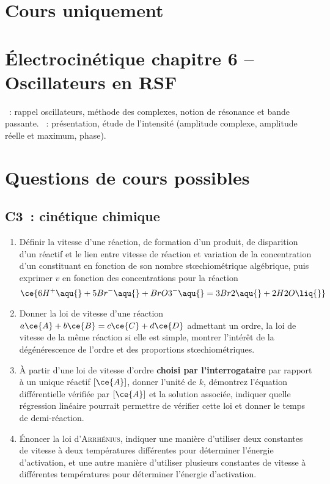 \documentclass[a4paper, 12pt, final, garamond]{book}
\begin{document}
\section{Cours uniquement}
\section*{Électrocinétique chapitre 6 -- Oscillateurs en RSF}
\begin{enumerate}[label=\Roman*]
	~: rappel oscillateurs, méthode des complexes,
	notion de résonance et bande passante.
	~: présentation,
	étude de l'intensité (amplitude complexe, amplitude réelle et maximum,
	phase).
\end{enumerate}

\section{Questions de cours possibles}
\subsection{C3~: cinétique chimique}
\begin{enumerate}
	\item Définir la vitesse d'une réaction, de formation d'un produit, de
	      disparition d'un réactif et le lien entre vitesse de réaction et
	      variation de la concentration d'un constituant en fonction de son nombre
	      stœchiométrique algébrique, puis exprimer $v$ en fonction des
	      concentrations pour la réaction
	      \[
		      \ce{6H^{+}\aqu{} + 5Br^{-}\aqu{} + BrO3^{-}\aqu{}
			      =
			      3Br2\aqu{} + 2H2O\liq{}}
	      \]
	\item Donner la loi de vitesse d'une réaction $a\ce{A} + b\ce{B} = c\ce{C}
		      + d\ce{D}$ admettant un ordre, la loi de vitesse de la même réaction
	      si elle est simple, montrer l'intérêt de la dégénérescence de l'ordre
	      et des proportions stœchiométriques.
	\item À partir d'une loi de vitesse d'ordre \textbf{choisi par
		      l'interrogataire} par rapport à un unique réactif $[\ce{A}]$, donner
	      l'unité de $k$, démontrez l'équation différentielle vérifiée par
	      $[\ce{A}]$ et la solution associée, indiquer quelle régression linéaire
	      pourrait permettre de vérifier cette loi et donner le temps de
	      demi-réaction.
	\item Énoncer la loi d'\textsc{Arrhénius}, indiquer une manière d'utiliser
	      deux constantes de vitesse à deux températures différentes pour
	      déterminer l'énergie d'activation, et une autre manière d'utiliser
	      plusieurs constantes de vitesse à différentes températures pour
	      déterminer l'énergie d'activation.
\end{enumerate}
\end{document}
